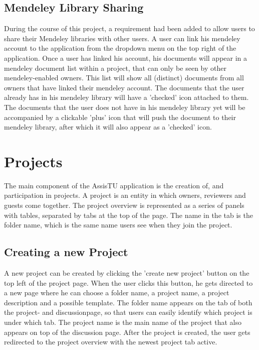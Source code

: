 \subsection{Mendeley Library Sharing}

During the course of this project, a requirement had been added to allow users to share their Mendeley libraries with other users. A user can
link his mendeley account to the application from the dropdown menu on the top right of the application. Once a user has linked his account,
his documents will appear in a mendeley document list within a project, that can only be seen by other mendeley-enabled owners. This list will show
all (distinct) documents from all owners that have linked their mendeley account. The documents that the user already has in his mendeley library
will have a 'checked' icon attached to them. The documents that the user does not have in his mendeley library yet will be accompanied by a clickable 
'plus' icon that will push the document to their mendeley library, after which it will also appear as a 'checked' icon.

\section{Projects}

The main component of the AssisTU application is the creation of, and participation in projects. A project is an entity in which owners, reviewers and 
guests come together. 
The project overview is represented as a series of panels with tables, separated by tabs at the top of the page. The name in the tab is the folder 
name, which is the same name users see when they join the project. 

\subsection{Creating a new Project}

A new project can be created by clicking the 'create new project' button on the top left of the project page. When the user clicks this button,
he gets directed to a new page where he can choose a folder name, a project name, a project description and a possible template. The folder name
appears on the tab of both the project- and discussionpage, so that users can easily identify which project is under which tab. The project
name is the main name of the project that also appears on top of the discussion page. After the project is created, the user gets redirected
to the project overview with the newest project tab active.

